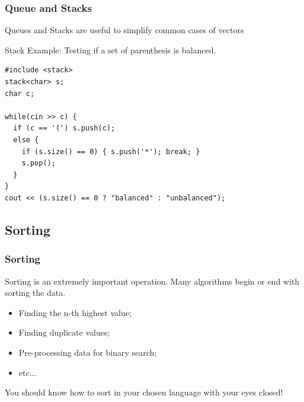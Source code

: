 \documentclass{beamer}
\begin{document}
\begin{frame}[fragile]
  \frametitle{Queue and Stacks}

  \begin{block}{}
    Queues and Stacks are useful to simplify common cases of vectors
  \end{block}

  Stack Example: Testing if a set of parenthesis is balanced.
{\small
\begin{verbatim}
#include <stack>
stack<char> s;
char c;

while(cin >> c) {
  if (c == '(') s.push(c);
  else { 
    if (s.size() == 0) { s.push('*'); break; }
    s.pop();
  }
}
cout << (s.size() == 0 ? "balanced" : "unbalanced");

\end{verbatim}}
\end{frame}



\subsection{Sorting}
\begin{frame}
  \frametitle{Sorting}

  Sorting is an extremely important operation. Many algorithms begin
  or end with sorting the data.

  \bigskip
  
  {\small
    \begin{itemize}
    \item Finding the n-th highest value;
    \item Finding duplicate values;
    \item Pre-processing data for binary search;
    \item etc...
    \end{itemize}
  }
  
  
  \begin{block}{}
    You should know how to sort in your chosen language with your eyes closed!
  \end{block}
  
\end{frame}
  
\end{document}

